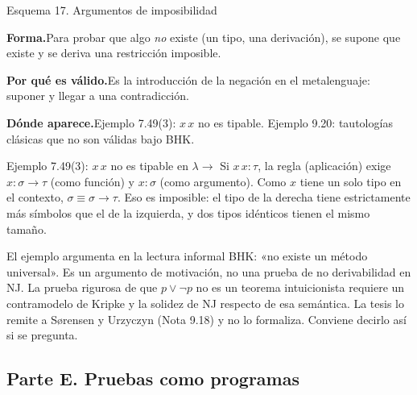 \documentclass[11pt,a4paper]{article}
\newcommand{\forma}{\par\noindent\textbf{Forma.}\enspace}
\newcommand{\porque}{\par\smallskip\noindent\textbf{Por qué es válido.}\enspace}
\newcommand{\donde}{\par\smallskip\noindent\textbf{Dónde aparece.}\enspace}
\begin{document}
\begin{esquema}{Esquema 17. Argumentos de imposibilidad}
\forma Para probar que algo \emph{no} existe (un tipo, una derivación), se
supone que existe y se deriva una restricción imposible.

\porque Es la introducción de la negación en el metalenguaje: suponer y llegar
a una contradicción.

\donde Ejemplo 7.49(3): \(x\,x\) no es tipable. Ejemplo 9.20: tautologías
clásicas que no son válidas bajo BHK.
\end{esquema}

\begin{ejemplotesis}{Ejemplo 7.49(3): \(x\,x\) no es tipable en \(\lambda\!\to\)}
Si \(x\,x:\tau\), la regla (aplicación) exige \(x:\sigma\to\tau\) (como
función) y \(x:\sigma\) (como argumento). Como \(x\) tiene un solo tipo en el
contexto, \(\sigma\equiv\sigma\to\tau\). Eso es imposible: el tipo de la
derecha tiene estrictamente más símbolos que el de la izquierda, y dos tipos
idénticos tienen el mismo tamaño.
\end{ejemplotesis}

\begin{trampa}
El ejemplo argumenta en la lectura informal BHK: «no existe un método
universal». Es un argumento de motivación, no una prueba de no derivabilidad
en NJ. La prueba rigurosa de que \(p\vee\neg p\) no es un teorema
intuicionista requiere un contramodelo de Kripke y la solidez de NJ respecto
de esa semántica. La tesis lo remite a Sørensen y Urzyczyn (Nota 9.18) y no lo
formaliza. Conviene decirlo así si se pregunta.
\end{trampa}

\subsection*{Parte E. Pruebas como programas}
\end{document}
